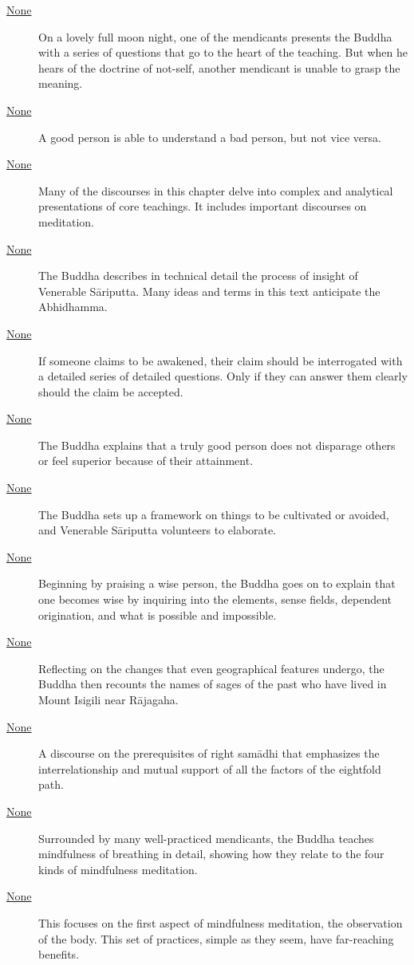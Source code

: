 \documentclass[12pt,openany]{book}%
\begin{document}
\begin{description}
\item[\href{\#mn109}{None}] On a lovely full moon night, one of the mendicants presents the Buddha with a series of questions that go to the heart of the teaching. But when he hears of the doctrine of not-self, another mendicant is unable to grasp the meaning.%
\item[\href{\#mn110}{None}] A good person is able to understand a bad person, but not vice versa.%
\item[\href{\#mn{-}anupadavagga}{None}] Many of the discourses in this chapter delve into complex and analytical presentations of core teachings. It includes important discourses on meditation.%
\item[\href{\#mn111}{None}] The Buddha describes in technical detail the process of insight of Venerable \textsanskrit{Sāriputta}. Many ideas and terms in this text anticipate the Abhidhamma.%
\item[\href{\#mn112}{None}] If someone claims to be awakened, their claim should be interrogated with a detailed series of detailed questions. Only if they can answer them clearly should the claim be accepted.%
\item[\href{\#mn113}{None}] The Buddha explains that a truly good person does not disparage others or feel superior because of their attainment.%
\item[\href{\#mn114}{None}] The Buddha sets up a framework on things to be cultivated or avoided, and Venerable \textsanskrit{Sāriputta} volunteers to elaborate.%
\item[\href{\#mn115}{None}] Beginning by praising a wise person, the Buddha goes on to explain that one becomes wise by inquiring into the elements, sense fields, dependent origination, and what is possible and impossible.%
\item[\href{\#mn116}{None}] Reflecting on the changes that even geographical features undergo, the Buddha then recounts the names of sages of the past who have lived in Mount Isigili near \textsanskrit{Rājagaha}.%
\item[\href{\#mn117}{None}] A discourse on the prerequisites of right \textsanskrit{samādhi} that emphasizes the interrelationship and mutual support of all the factors of the eightfold path.%
\item[\href{\#mn118}{None}] Surrounded by many well-practiced mendicants, the Buddha teaches mindfulness of breathing in detail, showing how they relate to the four kinds of mindfulness meditation.%
\item[\href{\#mn119}{None}] This focuses on the first aspect of mindfulness meditation, the observation of the body. This set of practices, simple as they seem, have far-reaching benefits.%

\end{description}
\end{document}
